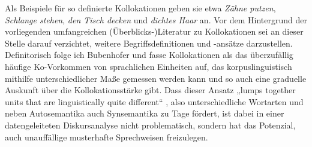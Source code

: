 Als Beispiele für so definierte Kollokationen geben sie etwa \emph{Zähne putzen}, \emph{Schlange stehen}, \emph{den Tisch decken} und \emph{dichtes Haar} an. Vor dem Hintergrund der vorliegenden umfangreichen (Überblicks\mbox{-})Literatur zu Kollokationen \autocites[siehe etwa][]{storjohannKookkurrenzAusKorpuslinguistischer2016, almela-sanchezLexicalCollocationAnalysis2018, bubenhoferSprachgebrauchsmusterKorpuslinguistikAls2009, evertStatisticsWordCooccurrences2005, stefanowitschCorpusLinguisticsGuide2020} sei an dieser Stelle darauf verzichtet, weitere Begriffsdefinitionen und -ansätze darzustellen. Definitorisch folge ich Bubenhofer und fasse Kollokationen als das überzufällig häufige Ko-Vorkommen von sprachlichen Einheiten auf, das korpuslinguistisch mithilfe unterschiedlicher Maße gemessen werden kann und so auch eine graduelle Auskunft über die Kollokationsstärke gibt. Dass dieser Ansatz „lumps together units that are linguistically quite different`` \autocite[231]{grangerFormulaicSequencesLearner2018}, also unterschiedliche Wortarten und neben Autosemantika auch Synsemantika zu Tage fördert, ist dabei in einer datengeleiteten Diskursanalyse nicht problematisch, sondern hat das Potenzial, auch unauffällige musterhafte Sprechweisen freizulegen.

\label{wie-funktioniert-die-berechnung-von-kollokationen}

